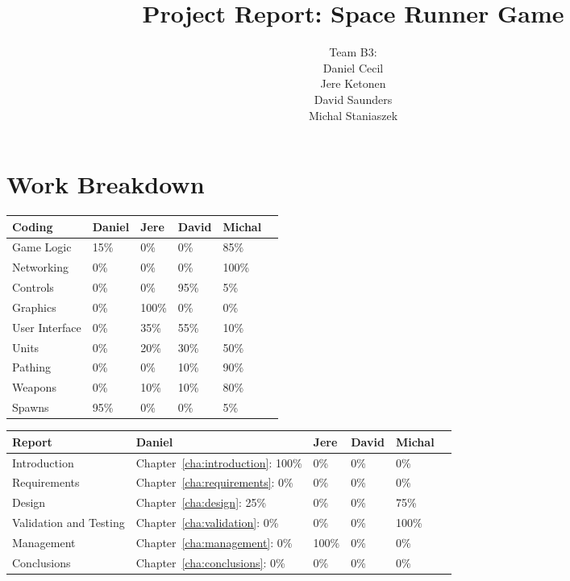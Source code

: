 \documentclass[10pt]{report}
\title{Project Report: Space Runner Game}
\author{Team B3:\\
Daniel Cecil\\
Jere Ketonen\\
David Saunders\\
Michal Staniaszek
}
\begin{document}
\maketitle
\tableofcontents
\chapter*{Work Breakdown}
\label{work-breakdown}

\thispagestyle{empty}

\begin{center}
  \begin{tabular}{|l||l|l|l|l|l|}\hline
    \textbf{Coding} & \textbf{Daniel} & \textbf{Jere} & \textbf{David}
    & \textbf{Michal} \\\hline\hline
    Game Logic &  15\% & 0\% & 0\% & 85\%\\\hline
    Networking &  0\% & 0\% & 0\% & 100\%\\\hline
    Controls &  0\% & 0\% & 95\% & 5\%\\\hline
    Graphics &  0\% & 100\% & 0\% & 0\%\\\hline
    User Interface &  0\% & 35\% & 55\% & 10\%\\\hline
    Units &  0\% & 20\% & 30\% & 50\%\\\hline
    Pathing &  0\% & 0\% & 10\% & 90\%\\\hline
    Weapons &  0\% & 10\% & 10\% & 80\%\\\hline
    Spawns &  95\% & 0\% & 0\% & 5\%\\\hline
  \end{tabular}\vspace*{1cm}

  \begin{tabular}{|l||l|l|l|l|l|}\hline
    \textbf{Report} & \textbf{Daniel} & \textbf{Jere} & \textbf{David}
    & \textbf{Michal}\\\hline\hline
    Introduction & Chapter~\ref{cha:introduction}: 100\% & 0\% & 0\% & 0\%\\\hline
    Requirements & Chapter~\ref{cha:requirements}: 0\% & 0\% & 0\% & 0\%\\\hline
    Design & Chapter~\ref{cha:design}: 25\% & 0\% & 0\% & 75\%\\\hline
    Validation and Testing & Chapter~\ref{cha:validation}: 0\% & 0\% & 0\% & 100\%\\\hline
    Management & Chapter~\ref{cha:management}: 0\% & 100\% & 0\% & 0\%\\\hline
    Conclusions & Chapter~\ref{cha:conclusions}: 0\% & 0\% & 0\% & 0\%\\\hline
  \end{tabular}
\end{center}
\end{document}
